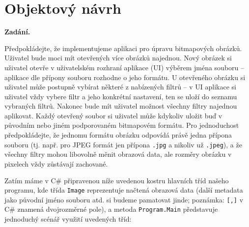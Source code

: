 \section{Objektový návrh}

\noindent\textbf{Zadání.}\par
Předpokládejte, že implementujeme aplikaci pro úpravu bitmapových obrázků. Uživatel
bude moci mít otevřených více obrázků najednou. Nový obrázek si uživatel otevře
v uživatelském rozhraní aplikace (UI) výběrem jména souboru -- aplikace dle přípony
souboru rozhodne o jeho formátu. U otevřeného obrázku si uživatel může postupně
vybírat některé z nabízených filtrů -- v UI aplikace si uživatel vždy vybere filtr
a jeho konkrétní nastavení, ten se uloží do seznamu vybraných filtrů. Nakonec bude
mít uživatel možnost všechny filtry najednou aplikovat. Každý otevřený soubor si
uživatel může kdykoliv uložit buď v původním nebo jiném podporovaném bitmapovém
formátu. Pro jednoduchost předpokládejte, že jednomu formátu obrázku odpovídá právě
jedna přípona souboru (tj. např. pro JPEG formát jen přípona \texttt{.jpg} a nikoliv
už \texttt{.jpeg}), a že všechny filtry mohou libovolně měnit obrazová data, ale
rozměry obrázku v pixelech vždy zůstávají zachované.

\medskip
Zatím máme v C\# připravenou níže uvedenou kostru hlavních tříd našeho programu, kde
třída \texttt{Image} reprezentuje načtená obrazová data (další metadata jako původní
jméno souboru atd. si budeme pamatovat jinde; poznámka: \texttt{[,]} v C\# znamená
dvojrozměrné pole), a metoda \texttt{Program.Main} představuje jednoduchý scénář
využití uvedených tříd:

